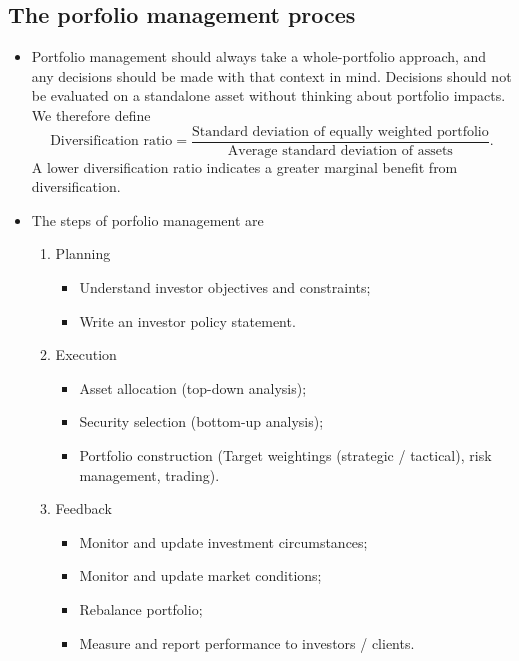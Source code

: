 \documentclass[../notes_compiled.tex]{subfiles}
\begin{document}
\subsection{The porfolio management proces}
\begin{itemize}
\item Portfolio management should always take a whole-portfolio approach, and any decisions should be made with that context in mind. Decisions should not be evaluated on a standalone asset without thinking about portfolio impacts. We therefore define
\begin{equation}
\text{Diversification ratio} = \frac{\text{Standard deviation of equally weighted portfolio}}{\text{Average standard deviation of assets}}.
\end{equation}
A lower diversification ratio indicates a greater marginal benefit from diversification.
\item The steps of porfolio management are
\begin{enumerate}
\item Planning
\begin{itemize}
\item Understand investor objectives and constraints;
\item Write an investor policy statement.
\end{itemize}
\item Execution
\begin{itemize}
\item Asset allocation (top-down analysis);
\item Security selection (bottom-up analysis);
\item Portfolio construction (Target weightings (strategic / tactical), risk management, trading).
\end{itemize}
\item Feedback
\begin{itemize}
\item Monitor and update investment circumstances;
\item Monitor and update market conditions;
\item Rebalance portfolio;
\item Measure and report performance to investors / clients.
\end{itemize}
\end{enumerate}
\end{itemize}
\end{document}
